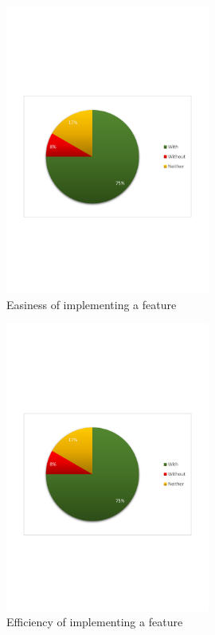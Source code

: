 \begin{figure}[H]
  \centering
    \includegraphics[width=0.6\textwidth]{images/charts/implementing_easier.pdf}
	\caption{Easiness of implementing a feature}
	\label{fig:implementing_easier}
\end{figure}

\begin{figure}[H]
  \centering
    \includegraphics[width=0.6\textwidth]{images/charts/implementing_efficient.pdf}
	\caption{Efficiency of implementing a feature}
	\label{fig:implementing_efficient}
\end{figure}

